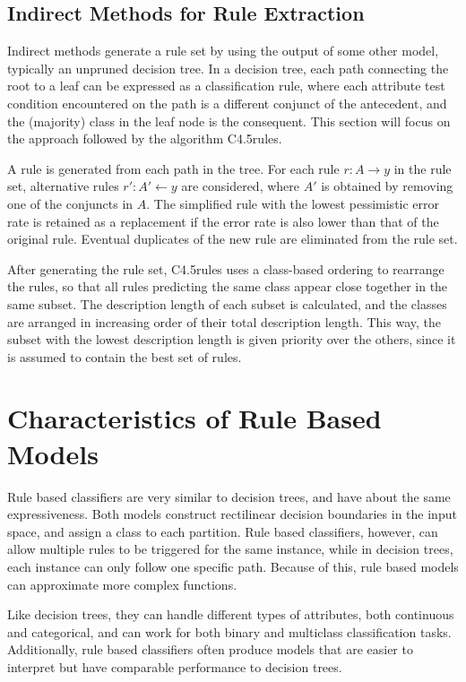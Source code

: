 \subsection{Indirect Methods for Rule Extraction}

Indirect methods generate a rule set by using the output of some other model, typically an unpruned decision tree. In a decision tree, each path connecting the root to a leaf can be expressed as a classification rule, where each attribute test condition encountered on the path is a different conjunct of the antecedent, and the (majority) class in the leaf node is the consequent. This section will focus on the approach followed by the algorithm C4.5rules.

A rule is generated from each path in the tree. For each rule $r : A \rightarrow{} y$ in the rule set, alternative rules $r' : A' \leftarrow{} y$ are considered, where $A'$ is obtained by removing one of the conjuncts in $A$. The simplified rule with the lowest pessimistic error rate is retained as a replacement if the error rate is also lower than that of the original rule. Eventual duplicates of the new rule are eliminated from the rule set.

After generating the rule set, C4.5rules uses a class-based ordering to rearrange the rules, so that all rules predicting the same class appear close together in the same subset. The description length of each subset is calculated, and the classes are arranged in increasing order of their total description length. This way, the subset with the lowest description length is given priority over the others, since it is assumed to contain the best set of rules.

\section{Characteristics of Rule Based Models}

Rule based classifiers are very similar to decision trees, and have about the same expressiveness. Both models construct rectilinear decision boundaries in the input space, and assign a class to each partition. Rule based classifiers, however, can allow multiple rules to be triggered for the same instance, while in decision trees, each instance can only follow one specific path. Because of this, rule based models can approximate more complex functions.

Like decision trees, they can handle different types of attributes, both continuous and categorical, and can work for both binary and multiclass classification tasks. Additionally, rule based classifiers often produce models that are easier to interpret but have comparable performance to decision trees.

